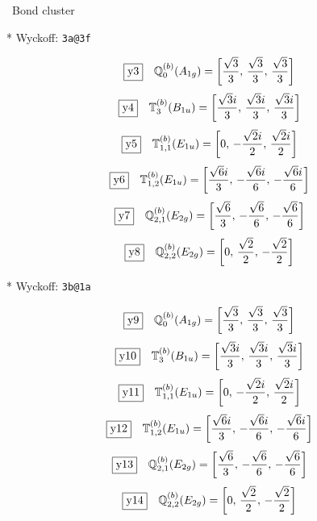\documentclass[fleqn,10pt,landscape]{jsarticle}
\begin{document}
\noindent\textbullet\, Bond cluster

\vspace{5mm}

\noindent ** Wyckoff: \texttt{3a@3f}

\begin{dmath*}
\fbox{y3}\quad \mathbb{Q}_{0}^{(b)}(A_{1g})=\left[ \frac{\sqrt{3}}{3},\, \frac{\sqrt{3}}{3},\, \frac{\sqrt{3}}{3} \right]
\end{dmath*}
\begin{dmath*}
\fbox{y4}\quad \mathbb{T}_{3}^{(b)}(B_{1u})=\left[ \frac{\sqrt{3} i}{3},\, \frac{\sqrt{3} i}{3},\, \frac{\sqrt{3} i}{3} \right]
\end{dmath*}
\begin{dmath*}
\fbox{y5}\quad \mathbb{T}_{1,1}^{(b)}(E_{1u})=\left[ 0,\, - \frac{\sqrt{2} i}{2},\, \frac{\sqrt{2} i}{2} \right]
\end{dmath*}
\begin{dmath*}
\fbox{y6}\quad \mathbb{T}_{1,2}^{(b)}(E_{1u})=\left[ \frac{\sqrt{6} i}{3},\, - \frac{\sqrt{6} i}{6},\, - \frac{\sqrt{6} i}{6} \right]
\end{dmath*}
\begin{dmath*}
\fbox{y7}\quad \mathbb{Q}_{2,1}^{(b)}(E_{2g})=\left[ \frac{\sqrt{6}}{3},\, - \frac{\sqrt{6}}{6},\, - \frac{\sqrt{6}}{6} \right]
\end{dmath*}
\begin{dmath*}
\fbox{y8}\quad \mathbb{Q}_{2,2}^{(b)}(E_{2g})=\left[ 0,\, \frac{\sqrt{2}}{2},\, - \frac{\sqrt{2}}{2} \right]
\end{dmath*}
\vspace{5mm}

\noindent ** Wyckoff: \texttt{3b@1a}

\begin{dmath*}
\fbox{y9}\quad \mathbb{Q}_{0}^{(b)}(A_{1g})=\left[ \frac{\sqrt{3}}{3},\, \frac{\sqrt{3}}{3},\, \frac{\sqrt{3}}{3} \right]
\end{dmath*}
\begin{dmath*}
\fbox{y10}\quad \mathbb{T}_{3}^{(b)}(B_{1u})=\left[ \frac{\sqrt{3} i}{3},\, \frac{\sqrt{3} i}{3},\, \frac{\sqrt{3} i}{3} \right]
\end{dmath*}
\begin{dmath*}
\fbox{y11}\quad \mathbb{T}_{1,1}^{(b)}(E_{1u})=\left[ 0,\, - \frac{\sqrt{2} i}{2},\, \frac{\sqrt{2} i}{2} \right]
\end{dmath*}
\begin{dmath*}
\fbox{y12}\quad \mathbb{T}_{1,2}^{(b)}(E_{1u})=\left[ \frac{\sqrt{6} i}{3},\, - \frac{\sqrt{6} i}{6},\, - \frac{\sqrt{6} i}{6} \right]
\end{dmath*}
\begin{dmath*}
\fbox{y13}\quad \mathbb{Q}_{2,1}^{(b)}(E_{2g})=\left[ \frac{\sqrt{6}}{3},\, - \frac{\sqrt{6}}{6},\, - \frac{\sqrt{6}}{6} \right]
\end{dmath*}
\begin{dmath*}
\fbox{y14}\quad \mathbb{Q}_{2,2}^{(b)}(E_{2g})=\left[ 0,\, \frac{\sqrt{2}}{2},\, - \frac{\sqrt{2}}{2} \right]
\end{dmath*}
\vspace{5mm}
\end{document}
